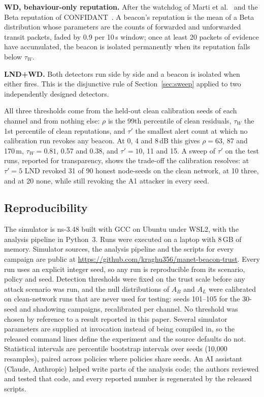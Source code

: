 \textbf{WD, behaviour-only reputation.} After the watchdog of Marti
et al.~\cite{marti2000mitigating} and the Beta reputation of
CONFIDANT~\cite{buchegger2002confidant}. A beacon's reputation is the mean of
a Beta distribution whose parameters are the counts of forwarded and
unforwarded transit packets, faded by 0.9 per 10\,s window; once at least 20
packets of evidence have accumulated, the beacon is isolated permanently when
its reputation falls below $\tau_W$.

\textbf{LND+WD.} Both detectors run side by side and a beacon is isolated
when either fires. This is the disjunctive rule of Section~\ref{sec:sweep}
applied to two independently designed detectors.

All three thresholds come from the held-out clean calibration seeds of each
channel and from nothing else: $\rho$ is the 99th percentile of clean
residuals, $\tau_W$ the 1st percentile of clean reputations, and $\tau'$ the
smallest alert count at which no calibration run revokes any beacon. At
0, 4 and 8\,dB this gives $\rho = 63$, 87 and 170\,m, $\tau_W = 0.81$, 0.57
and 0.38, and $\tau' = 10$, 11 and 15. A sweep of $\tau'$ on the test runs,
reported for transparency, shows the trade-off the calibration resolves: at
$\tau' = 5$ LND revoked 31 of 90 honest node-seeds on the clean network, at
10 three, and at 20 none, while still revoking the A1 attacker in every seed.

\subsection{Reproducibility}

The simulator is ns-3.48 built with GCC on Ubuntu under WSL2, with the analysis
pipeline in Python~3. Runs were executed on a laptop with 8\,GB of memory. Simulator sources, the analysis pipeline and the scripts
for every campaign are public at
\url{https://github.com/kraghu356/manet-beacon-trust}. Every run uses an explicit integer seed, so any run is
reproducible from its scenario, policy and seed. Detection thresholds were
fixed on the trust scale before any attack scenario was run, and the null
distributions of $A_B$ and $A_L$ were calibrated on clean-network runs that
are never used for testing: seeds 101--105 for the 30-seed and shadowing
campaigns, recalibrated per channel. No threshold was chosen by reference to a
result reported in this paper. Several simulator parameters are supplied at
invocation instead of being compiled in, so the released command lines
define the experiment and the source defaults do not. Statistical intervals are percentile
bootstrap intervals over seeds (10{,}000 resamples), paired across policies
where policies share seeds. An AI assistant (Claude, Anthropic) helped write
parts of the analysis code; the authors reviewed and tested that code, and
every reported number is regenerated by the released scripts.
